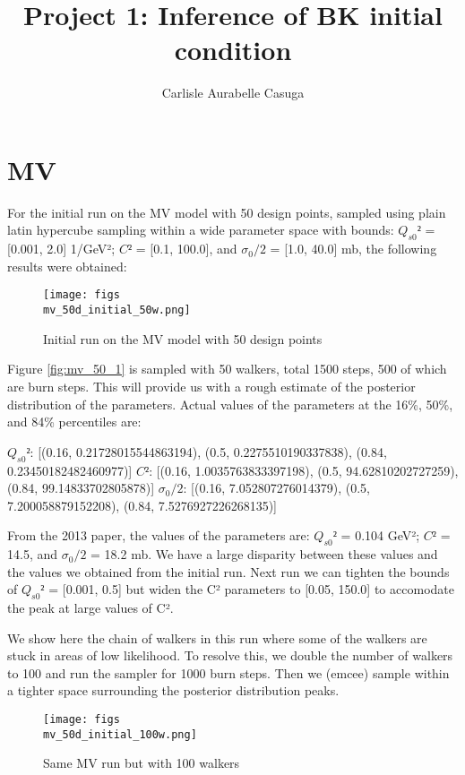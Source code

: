 \documentclass{article}
\title{Project 1: Inference of BK initial condition}
\author{Carlisle Aurabelle Casuga}
\begin{document}
\maketitle

\section{MV}

For the initial run on the MV model with 50 design points, sampled using plain latin hypercube sampling within a wide parameter  space with bounds: $Q_{s0}²$ = [0.001, 2.0] 1/GeV²; $C²$ = [0.1, 100.0], and $\sigma_{0}/2$ = [1.0, 40.0] mb, the following results were obtained: 

\begin{figure}[h]
\centering
\texttt{[image: figs\\mv\_50d\_initial\_50w.png]}
\caption{Initial run on the MV model with 50 design points}
\label{fig:mv_50d_50w}
\end{figure}

Figure \ref{fig:mv_50_1} is sampled with 50 walkers, total 1500 steps, 500 of which are burn steps. This will provide us with a rough estimate of the posterior distribution of the parameters. Actual values of the parameters at the 16\%, 50\%, and 84\% percentiles are:

$Q_{s0}²$: [(0.16, 0.21728015544863194), (0.5, 0.2275510190337838), (0.84, 0.23450182482460977)]
$C²$: [(0.16, 1.0035763833397198), (0.5, 94.62810202727259), (0.84, 99.14833702805878)]
$\sigma_{0}/2$: [(0.16, 7.052807276014379), (0.5, 7.200058879152208), (0.84, 7.5276927226268135)]

From the 2013 paper, the values of the parameters are: $Q_{s0}²$ = 0.104 GeV²; $C²$ = 14.5, and $\sigma_{0}/2$ = 18.2 mb. We have a large disparity between these values and the values we obtained from the initial run. Next run we can tighten the bounds of $Q_{s0}²$ = [0.001, 0.5] but widen the C² parameters to [0.05, 150.0] to accomodate the peak at large values of C².

We show here the chain of walkers in this run where some of the walkers are stuck in areas of low likelihood. To resolve this, we  double the number of walkers to 100 and run the sampler for 1000 burn steps. Then we (emcee) sample within a tighter space surrounding the posterior distribution peaks. 

\begin{figure}[h]
\centering
\texttt{[image: figs\\mv\_50d\_initial\_100w.png]}
\caption{Same MV run but with 100 walkers}
\label{fig:mv_50d_100w}
\end{figure}
\end{document}
